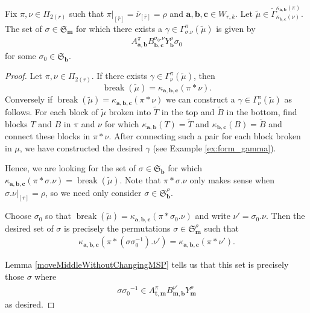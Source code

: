 \documentclass[ALCO,Unicode,published]{cedram}
\newcommand{\SG}{\mathfrak{S}}
\newcommand{\bfa}{{\boldsymbol{a}}}
\newcommand{\bfb}{{\boldsymbol{b}}}
\newcommand{\bfc}{{\boldsymbol{c}}}
\newcommand{\bft}{{\boldsymbol{t}}}
\newcommand{\bfm}{{\boldsymbol{m}}}
\newcommand{\tmu}{{\tilde{\mu}}}
\newcommand{\ov}[1]{\bar{#1}}
\newcommand{\ovb}[1]{\left[\ov{#1}\right]}
\DeclareMathOperator{\Break}{break}
\begin{document}
\begin{lemma}\label{lem:number_of_sigma} Fix $\pi,\nu\in\Pi_{2(r)}$ such that $\pi|_{\ovb{r}}=\ov\nu_{\ovb{r}}=\rho$ and $\bfa,\bfb,\bfc\in W_{r,k}$. Let $\tmu\in\tilde{\Gamma}_{\kappa_{\bfb,\bfc}(\nu)}^{\kappa_{\bfa,\bfb}(\pi)}$. The set of $\sigma\in \SG_\bfm$ for which there exists a $\gamma\in\Gamma_{\sigma.\nu}^\pi(\tmu)$ is given by
\begin{align*}
    A_{\bfa,\bfb}^\pi B_{\bfb,\bfc}^{\sigma_0.\nu} Y_\bfb^\rho\sigma_0
\end{align*}
for some $\sigma_0\in \SG_\bfb$.
\end{lemma}

\begin{proof}

Let $\pi,\nu\in\Pi_{2(r)}$. If there exists $\gamma\in\Gamma^\pi_\nu(\tmu)$, then \[\Break(\tmu)=\kappa_{\bfa,\bfb,\bfc}(\pi\ast\nu).\] Conversely if $\Break(\tmu)=\kappa_{\bfa,\bfb,\bfc}(\pi\ast\nu)$ we can construct a $\gamma\in\Gamma_\nu^\pi(\tmu)$ as follows. For each block of $\tmu$ broken into $\tilde T$ in the top and $\tilde B$ in the bottom, find blocks $T$ and $B$ in $\pi$ and $\nu$ for which $\kappa_{\bfa,\bfb}(T)=\tilde T$ and $\kappa_{\bfb,\bfc}(B)=\tilde B$ and connect these blocks in $\pi\ast\nu$. After connecting such a pair for each block broken in $\mu$, we have constructed the desired $\gamma$ (see Example \ref{ex:form_gamma}).

Hence, we are looking for the set of $\sigma\in\SG_\bfb$ for which $\kappa_{\bfa,\bfb,\bfc}(\pi\ast\sigma.\nu)=\Break(\tmu)$. Note that $\pi\ast\sigma.\nu$ only makes sense when $\sigma.\nu|_{[r]}=\rho$, so we need only consider $\sigma\in \SG_\bfb^\rho$.

Choose $\sigma_0$ so that $\Break(\tmu)=\kappa_{\bfa,\bfb,\bfc}(\pi\ast\sigma_0.\nu)$ and write $\nu'=\sigma_0.\nu$. Then the desired set of $\sigma$ is precisely the permutations $\sigma\in \SG_\bfm^\rho$ such that \begin{align*}
     \kappa_{\bfa,\bfb,\bfc}(\pi\ast(\sigma\sigma_0^{-1}).\nu')=\kappa_{\bfa,\bfb,\bfc}(\pi\ast\nu').
\end{align*}

Lemma \ref{moveMiddleWithoutChangingMSP} tells us that this set is precisely those $\sigma$ where \begin{align*}
    \sigma{\sigma_0}^{-1}\in A_{\bft,\bfm}^\pi B_{\bfm,\bfb}^{\nu'}Y_\bfm^\rho
\end{align*} as desired.
\end{proof}
\end{document}
